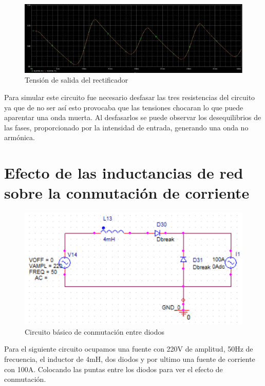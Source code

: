 \documentclass[12pt,a4paper]{article}
\begin{document}
\begin{figure}[hbtp]
\centering
\includegraphics[scale=0.35]{12.png}
\caption{Tensión de salida del rectificador}
\end{figure}
Para simular este circuito fue necesario desfasar las tres resistencias del circuito ya que de no ser así esto provocaba que las tensiones chocaran lo que puede aparentar una onda muerta. Al desfasarlos se puede observar los desequilibrios de las fases, proporcionado por la intensidad de entrada, generando una onda no armónica.

\newpage
\section{Efecto de las inductancias de red sobre la conmutación de corriente}
\begin{figure}[hbtp]
\centering
\includegraphics[scale=0.9]{13.png}
\caption{Circuito básico de conmutación entre diodos}
\end{figure}
Para el siguiente circuito ocupamos una fuente con 220V de amplitud, 50Hz de frecuencia, el inductor de 4mH, dos diodos y por ultimo una fuente de corriente con 100A.
Colocando las puntas entre los diodos para ver el efecto de conmutación. 
\end{document}
